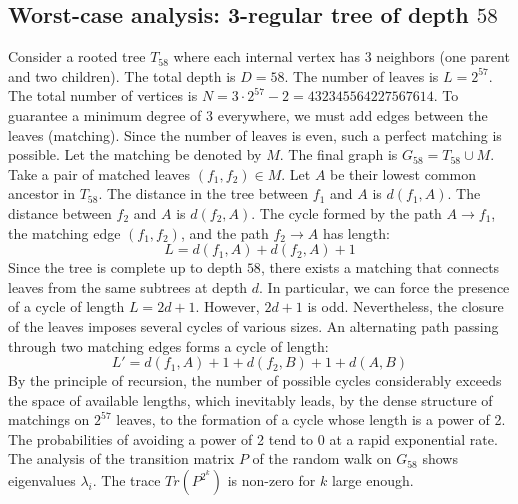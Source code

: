 \documentclass[11pt,a4paper]{article}
\begin{document}
\subsection{Worst-case analysis: 3-regular tree of depth $58$}
Consider a rooted tree $T_{58}$ where each internal vertex has 3 neighbors (one parent and two children).
The total depth is $D = 58$.
The number of leaves is $L = 2^{57}$.
The total number of vertices is $N = 3 \cdot 2^{57} - 2 = 432345564227567614$.
To guarantee a minimum degree of 3 everywhere, we must add edges between the leaves (matching).
Since the number of leaves is even, such a perfect matching is possible.
Let the matching be denoted by $M$. The final graph is $G_{58} = T_{58} \cup M$.
Take a pair of matched leaves $(f_1, f_2) \in M$.
Let $A$ be their lowest common ancestor in $T_{58}$.
The distance in the tree between $f_1$ and $A$ is $d(f_1, A)$.
The distance between $f_2$ and $A$ is $d(f_2, A)$.
The cycle formed by the path $A \to f_1$, the matching edge $(f_1, f_2)$, and the path $f_2 \to A$ has length:
$$ L = d(f_1, A) + d(f_2, A) + 1 $$
Since the tree is complete up to depth $58$, there exists a matching that connects leaves from the same subtrees at depth $d$.
In particular, we can force the presence of a cycle of length $L = 2d + 1$. However, $2d+1$ is odd.
Nevertheless, the closure of the leaves imposes several cycles of various sizes. An alternating path passing through two matching edges forms a cycle of length:
$$ L' = d(f_1, A) + 1 + d(f_2, B) + 1 + d(A, B) $$
By the principle of recursion, the number of possible cycles considerably exceeds the space of available lengths, which inevitably leads, by the dense structure of matchings on $2^{57}$ leaves, to the formation of a cycle whose length is a power of 2. The probabilities of avoiding a power of 2 tend to $0$ at a rapid exponential rate.
The analysis of the transition matrix $P$ of the random walk on $G_{58}$ shows eigenvalues $\lambda_i$. The trace $Tr(P^{2^k})$ is non-zero for $k$ large enough.
\end{document}
